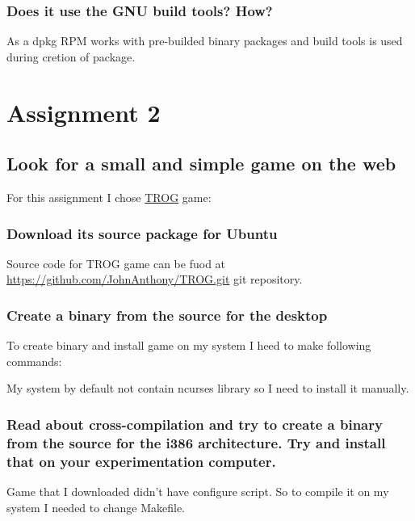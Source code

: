 \documentclass[a4paper,11pt]{article}
\begin{document}
\subsubsection{Does it use the GNU build tools? How?}
As a dpkg RPM works with pre-builded binary packages and build tools is used during cretion of package.


\section{Assignment 2}
\subsection{Look for a small and simple game on the web}
For this assignment I chose \href{https://github.com/JohnAnthony/TROG}{TROG} game: 
\subsubsection{Download its source package for Ubuntu}
Source code for TROG game can be fuod at \href{https://github.com/JohnAnthony/TROG.git}{https://github.com/JohnAnthony/TROG.git} git repository.

\subsubsection{Create a binary from the source for the desktop}
To create binary and install game on my system I heed to make following commands:


My system by default not contain ncurses library so I need to install it manually.

\subsubsection{Read about cross-compilation and try to create a binary from the source for the i386 architecture. Try and install that on your experimentation computer.}
Game that I downloaded didn't have configure script. So to compile it on my system I needed to change Makefile.
\end{document}
